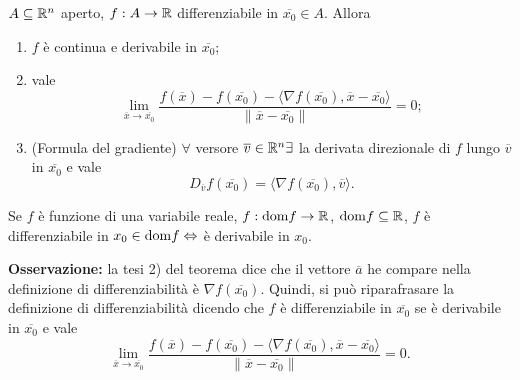 \begin{theorem}
	\label{th: pag 337}
	
	$A\subseteq\mathbb{R}^n$ aperto, $f:A\rightarrow\mathbb{R}$ differenziabile in $\overline{x_0}\in A$. Allora 
	\begin{enumerate}
		\item $f$ è continua e derivabile in $\overline{x_0}$;
		\item vale 
		\begin{equation*}
			\lim_{\overline{x}\rightarrow\overline{x_0}}\frac{f(\overline{x})-f(\overline{x_0})-\langle \nabla f(\overline{x_0}),\overline{x}-\overline{x_0}\rangle}{\|\overline{x}-\overline{x_0}\|}=0;
		\end{equation*}
		\item (Formula del gradiente) $\forall$ versore $\overline{v}\in\mathbb{R}^n\exists$ la derivata direzionale di $f$ lungo $\overline{v}$ in $\overline{x_0}$ e vale
		\begin{equation*}
			D_{\overline{v}}f(\overline{x_0})=\langle \nabla f(\overline{x_0}), \overline{v} \rangle.
		\end{equation*}
	\end{enumerate}
\end{theorem}


\begin{attbar}
	Se $f$ è funzione di una variabile reale, $f: \mathrm{dom} f\rightarrow\mathbb{R}$, $\mathrm{dom} f \subseteq\mathbb{R}$, $f$ è differenziabile in $x_0\in \mathrm{dom} f \Leftrightarrow$ è derivabile in $x_0$.
\end{attbar}


\textbf{Osservazione:} la tesi 2) del teorema dice che il vettore $\overline{a}$ he compare nella definizione di differenziabilità è $\nabla f(\overline{x_0})$. Quindi, si può riparafrasare la definizione di differenziabilità dicendo che $f$ è differenziabile in $\overline{x_0}$ se è derivabile in $\overline{x_0}$ e vale 
\begin{equation*}
	\lim_{\overline{x}\rightarrow\overline{x_0}}\frac{f(\overline{x})-f(\overline{x_0})-\langle \nabla f(\overline{x_0}),\overline{x}-\overline{x_0}\rangle}{\|\overline{x}-\overline{x_0}\|}=0.
\end{equation*}


